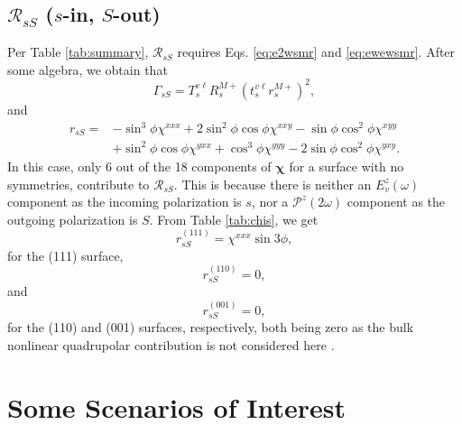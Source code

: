 
\subsection{\texorpdfstring{$\mathcal{R}_{sS}$ ($s$-in, $S$-out)}
{RsS (s-in, S-out)}}
\label{sec:RsS}

Per Table \ref{tab:summary}, $\mathcal{R}_{sS}$ requires Eqs. \eqref{eq:e2wsmr}
and \eqref{eq:ewewsmr}. After some algebra, we obtain that
\begin{equation}
\Gamma_{sS} = 
T_{s}^{v\ell}R^{M+}_{s}\left(t^{v\ell}_{s}r^{M+}_{s}\right)^{2},
\end{equation}
and
\begin{equation}
\begin{split}
r_{sS} = 
&- \sin^{3}\phi\chi^{xxx}
 + 2\sin^{2}\phi\cos\phi\chi^{xxy}
 - \sin\phi\cos^{2}\phi\chi^{xyy}\\
&+ \sin^{2}\phi\cos\phi\chi^{yxx}
 + \cos^{3}\phi\chi^{yyy}
 - 2\sin\phi\cos^{2}\phi\chi^{yxy}.
\end{split}
\end{equation}
In this case, only 6 out of the 18 components of $\boldsymbol{\chi}$ for a
surface with no symmetries, contribute to $\mathcal{R}_{sS}$. This is because
there is neither an $E^{z}_{v}(\omega)$ component as the incoming polarization is
$s$, nor a $\mathcal{P}^{z}(2\omega)$ component as the outgoing polarization is
$S$. From Table \ref{tab:chis}, we get
\begin{equation}\label{eq:rss111}
r^{(111)}_{sS} = \chi^{xxx}\sin3\phi,
\end{equation}
for the (111) surface,
\begin{equation}\label{eq:rss110}
r^{(110)}_{sS} = 0,
\end{equation}
and
\begin{equation}\label{eq:rss001}
r^{(001)}_{sS} = 0,
\end{equation}
for the (110) and (001) surfaces, respectively, both being zero as the bulk
nonlinear quadrupolar contribution is not considered here \cite{sipePRB87}.



\section{Some Scenarios of Interest}\label{sec:scenarios}

